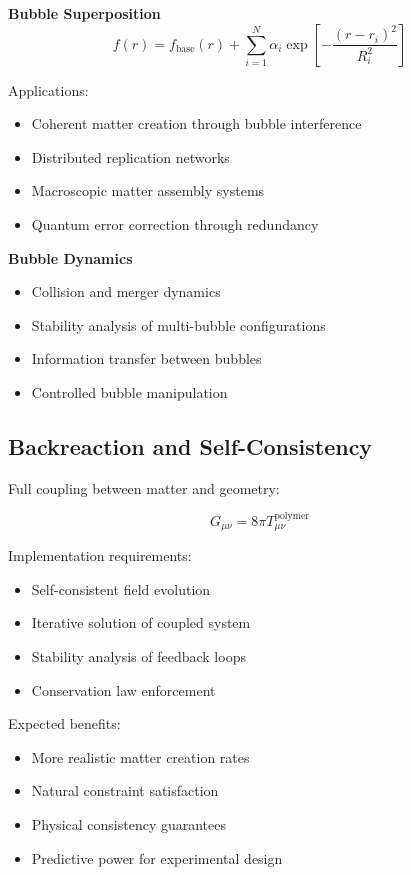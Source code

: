\documentclass[11pt]{article}
\begin{document}
\textbf{Bubble Superposition}
\begin{equation}
f(r) = f_{\text{base}}(r) + \sum_{i=1}^N \alpha_i \exp\left[-\frac{(r-r_i)^2}{R_i^2}\right]
\end{equation}

Applications:
\begin{itemize}
\item Coherent matter creation through bubble interference
\item Distributed replication networks
\item Macroscopic matter assembly systems
\item Quantum error correction through redundancy
\end{itemize}

\textbf{Bubble Dynamics}
\begin{itemize}
\item Collision and merger dynamics
\item Stability analysis of multi-bubble configurations
\item Information transfer between bubbles
\item Controlled bubble manipulation
\end{itemize}

\subsection{Backreaction and Self-Consistency}

Full coupling between matter and geometry:

\begin{equation}
G_{\mu\nu} = 8\pi T_{\mu\nu}^{\text{polymer}}
\end{equation}

Implementation requirements:
\begin{itemize}
\item Self-consistent field evolution
\item Iterative solution of coupled system
\item Stability analysis of feedback loops
\item Conservation law enforcement
\end{itemize}

Expected benefits:
\begin{itemize}
\item More realistic matter creation rates
\item Natural constraint satisfaction
\item Physical consistency guarantees
\item Predictive power for experimental design
\end{itemize}
\end{document}
